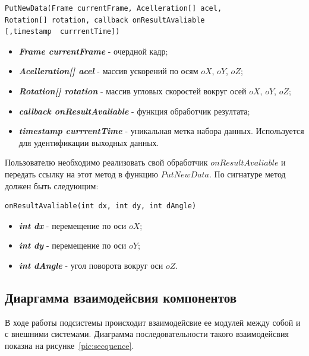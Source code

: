 \begin{verbatim}
PutNewData(Frame currentFrame, Acelleration[] acel,
Rotation[] rotation, callback onResultAvaliable 
[,timestamp  currrentTime])
\end{verbatim}
\begin{itemize}
\item \textbf{\textit{Frame currentFrame}} - очердной кадр; 
\item \textbf{\textit{Acelleration[] acel}} - массив ускорений по осям $oX$, $oY$, $o Z$;
\item \textbf{\textit{Rotation[] rotation}} - массив угловых скоростей вокруг осей $oX$, $oY$, $o Z$; 
\item \textbf{\textit{callback onResultAvaliable}} - функция обработчик резултата;
\item \textbf{\textit{timestamp  currrentTime}} - уникальная метка набора данных. Используется для удентификации выходных данных. 
\end{itemize}


Пользователю необходимо реализовать свой обработчик $onResultAvaliable$ и передать ссылку на этот метод в функцию $PutNewData$. По сигнатуре метод должен быть следующим:

\begin{verbatim}
onResultAvaliable(int dx, int dy, int dAngle)
\end{verbatim}

\begin{itemize}
\item \textbf{\textit{int dx}} - перемещение по оси $oX$;
\item \textbf{\textit{int dy}} - перемещение по оси $oY$;
\item \textbf{\textit{int dAngle}} - угол поворота вокруг оси $oZ$.
\end{itemize}


\subsection{Диаргамма взаимодейсвия компонентов}
В ходе работы подсистемы происходит взаимодейсвие ее модулей между собой и с внешними системами. Диаграмма последовательности такого взаимодейсвия показна на рисунке~\ref{pic:secquence}.


